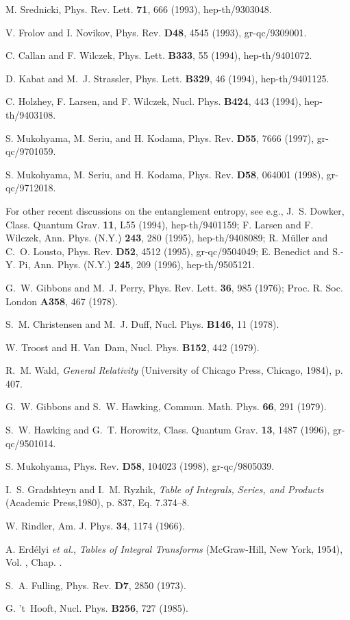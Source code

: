 \documentclass[12pt,epsf]{article}
\def\Rn#1{\uppercase\expandafter{\romannumeral#1}}
\begin{document}
\begin{thebibliography}{10}
M. Srednicki, Phys. Rev. Lett. {\bf 71},  666  (1993), hep-th/9303048.

V. Frolov and I. Novikov, Phys. Rev. {\bf D48},  4545  (1993), gr-qc/9309001.

C. Callan and F. Wilczek, Phys. Lett. {\bf B333},  55  (1994), hep-th/9401072.

D. Kabat and M.~J. Strassler, Phys. Lett. {\bf B329},  46  (1994),
  hep-th/9401125.

C. Holzhey, F. Larsen, and F. Wilczek, Nucl. Phys. {\bf B424},  443  (1994),
  hep-th/9403108.

S. Mukohyama, M. Seriu, and H. Kodama, Phys. Rev. {\bf D55},  7666  (1997),
  gr-qc/9701059.

S. Mukohyama, M. Seriu, and H. Kodama, Phys. Rev. {\bf D58},  064001  (1998),
  gr-qc/9712018.

For other recent discussions on the entanglement entropy,
see e.g.,
J.~S. Dowker, Class. Quantum Grav. {\bf 11},  L55  (1994), hep-th/9401159;
F. Larsen and F. Wilczek, Ann. Phys. (N.Y.) {\bf 243},  280  (1995),
  hep-th/9408089;
R. M{\"u}ller and C.~O. Lousto, Phys. Rev. {\bf D52},  4512  (1995),
  gr-qc/9504049;
E. Benedict and S.-Y. Pi, Ann. Phys. (N.Y.) {\bf 245},  209  (1996),
  hep-th/9505121.

G.~W. Gibbons and M.~J. Perry, Phys. Rev. Lett. {\bf 36},  985  (1976);
Proc. R. Soc. London {\bf A358},  467  (1978).

S.~M. Christensen and M.~J. Duff, Nucl. Phys. {\bf B146},  11  (1978).

W. Troost and H. Van~Dam, Nucl. Phys. {\bf B152},  442  (1979).

R.~M. Wald, {\em General Relativity} (University of Chicago Press, Chicago,
  1984), p. 407.

G.~W. Gibbons and S.~W. Hawking, Commun. Math. Phys. {\bf 66},  291  (1979).

S.~W. Hawking and G.~T. Horowitz, Class. Quantum Grav. {\bf 13},  1487  (1996),
  gr-qc/9501014.

S. Mukohyama, Phys. Rev. {\bf D58},  104023  (1998), gr-qc/9805039.

I.~S. Gradshteyn and I.~M. Ryzhik, {\em Table of Integrals, Series,
  and Products} (Academic Press,1980), p. 837, Eq. 7.374--8.

W. Rindler, Am. J. Phys. {\bf 34},  1174  (1966).

A. Erd\'elyi {\em et al.}, {\em Tables of Integral Transforms}
(McGraw-Hill, New York, 1954),
Vol. \Rn{2}, Chap. \Rn{12}.

S.~A. Fulling, Phys. Rev. {\bf D7},  2850  (1973).

G. 't~Hooft, Nucl. Phys. {\bf B256},  727  (1985).

\end{thebibliography}
\end{document}
